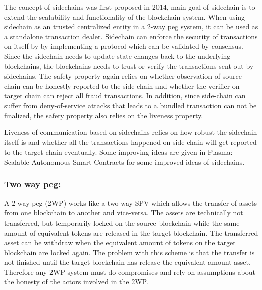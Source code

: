 \documentclass[pageno]{jpaper}
\begin{document}
    The concept of sidechains was first proposed in 2014, main goal of sidechain is to extend the scalability and functionality of the blockchain system. When using sidechain as an trusted centralized entity in a 2-way peg system, it can be used as a standalone transaction dealer. 
    Sidechain can enforce the security of transactions on itself by by implementing a protocol which can be validated by consensus. Since the sidechain needs to update state changes back to the underlying blockchains, the blockchains needs to trust or verify the transactions sent out by sidechains. The safety property again relies on whether observation of source chain can be honestly reported to the side chain and whether the verifier on target chain can reject all fraud transactions. In addition, since side-chain can suffer from deny-of-service attacks that leads to a bundled transaction can not be finalized, the safety property also relies on the liveness property.

    Liveness of communication based on sidechains relies on how robust the sidechain itself is and whether all the transactions happened on side chain will get reported to the target chain eventually. Some improving ideas are given in Plasma: Scalable Autonomous Smart Contracts for some improved ideas of sidechains.
\\
\subsubsection{Two way peg:}
    A 2-way peg (2WP) works like a two way SPV which allows the transfer of assets from one blockchain to another and vice-versa. The assets are technically not transferred, but temporarily locked on the source blockchain while the same amount of equivalent tokens are released in the target blockchain. The transferred asset can be withdraw when the equivalent amount of tokens on the target blockchain are locked again. The problem with this scheme is that the transfer is not finished until the target blockchain has release the equivalent amount asset. Therefore any 2WP system must do compromises and rely on assumptions about the honesty of the actors involved in the 2WP.
\\
\end{document}

